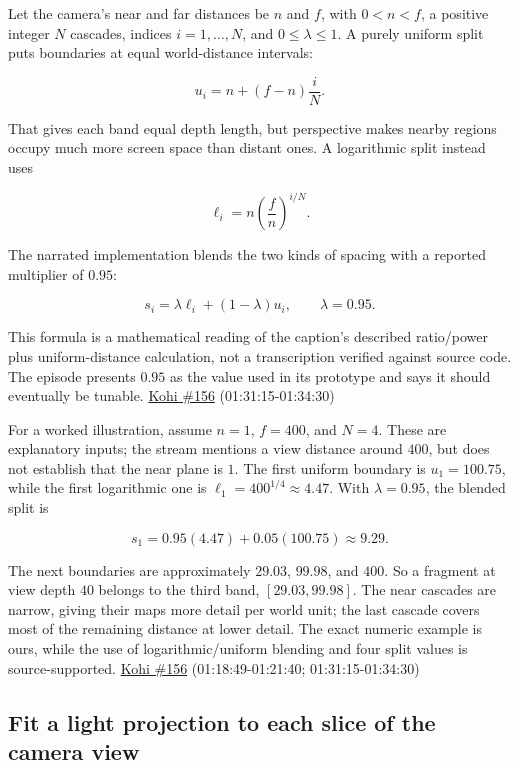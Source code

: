 Let the camera's near and far distances be \(n\) and \(f\), with \(0<n<f\), a positive integer \(N\) cascades, indices \(i=1,\ldots,N\), and \(0\leq\lambda\leq1\). A purely uniform split puts boundaries at equal world-distance intervals:

\[u_i=n+(f-n)\frac{i}{N}.\]

That gives each band equal depth length, but perspective makes nearby regions occupy much more screen space than distant ones. A logarithmic split instead uses

\[\ell_i=n\left(\frac{f}{n}\right)^{i/N}.\]

The narrated implementation blends the two kinds of spacing with a reported multiplier of \(0.95\):

\[s_i=\lambda\ell_i+(1-\lambda)u_i,\qquad \lambda=0.95.\]

This formula is a mathematical reading of the caption's described ratio/power plus uniform-distance calculation, not a transcription verified against source code. The episode presents \(0.95\) as the value used in its prototype and says it should eventually be tunable. \href{https://www.youtube.com/watch?v=coWS_saBPBk}{Kohi \#156} (01:31:15-01:34:30)

For a worked illustration, assume \(n=1\), \(f=400\), and \(N=4\). These are explanatory inputs; the stream mentions a view distance around \(400\), but does not establish that the near plane is \(1\). The first uniform boundary is \(u_1=100.75\), while the first logarithmic one is \(\ell_1=400^{1/4}\approx4.47\). With \(\lambda=0.95\), the blended split is

\[s_1=0.95(4.47)+0.05(100.75)\approx9.29.\]

The next boundaries are approximately \(29.03\), \(99.98\), and \(400\). So a fragment at view depth \(40\) belongs to the third band, \([29.03,99.98]\). The near cascades are narrow, giving their maps more detail per world unit; the last cascade covers most of the remaining distance at lower detail. The exact numeric example is ours, while the use of logarithmic/uniform blending and four split values is source-supported. \href{https://www.youtube.com/watch?v=coWS_saBPBk}{Kohi \#156} (01:18:49-01:21:40; 01:31:15-01:34:30)

\subsection{Fit a light projection to each slice of the camera view}\label{06-engine-ii-ch026-fit-a-light-projection-to-each-slice-of-the-camera-view}

